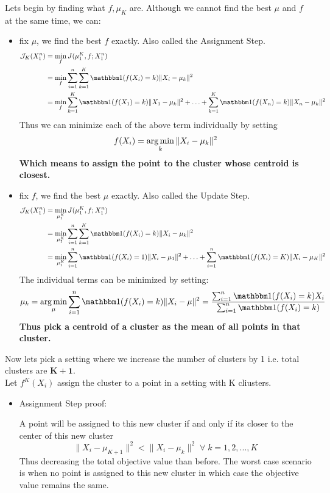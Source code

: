 \begin{enumerate}
\begin{soln}
Lets begin by finding what $f,\mu_K$ are. Although we cannot find the best $\mu$ and $f$ at the same time, we can:
\begin{itemize}
    \item fix $\mu$, we find the best $f$ exactly. Also called the Assignment Step.
    \begin{align*}
        \Jcal_K(X_1^n) &= \min_{f} J(\mu_1^K, f; X_1^n)\\
        &= \min_{f} \sum_{i=1}^n \sum_{k=1}^K \indfone(f(X_i) = k) \|X_i - \mu_k\|^2 \\
        &= \min_{f} \sum_{k=1}^K \indfone(f(X_1) = k) \|X_1 - \mu_k\|^2 + \ldots + \sum_{k=1}^K \indfone(f(X_n) = k) \|X_n - \mu_k\|^2
    \end{align*}
    Thus we can minimize each of the above term individually by setting
    $$
        f(X_i) = \operatorname*{arg\,min}_{k} \|X_i - \mu_k\|^2
    $$
    \textbf{Which means to assign the point to the cluster whose centroid is closest.}
    \item fix $f$, we find the best $\mu$ exactly. Also called the Update Step.
    \begin{align*}
        \Jcal_K(X_1^n) &= \min_{\mu_1^K} J(\mu_1^K, f; X_1^n)\\
        &= \min_{\mu_1^K} \sum_{i=1}^n \sum_{k=1}^K \indfone(f(X_i) = k) \|X_i - \mu_k\|^2 \\
        &= \min_{\mu_1^K} \sum_{i=1}^n \indfone(f(X_i) = 1) \|X_i - \mu_1\|^2 + \ldots + \sum_{i=1}^n \indfone(f(X_i) = K) \|X_i - \mu_K\|^2
    \end{align*}
    The individual terms can be minimized by setting:
    $$
        \mu_k = \argmin_{\mu} \sum_{i=1}^n\indfone(f(X_i) = k)\|X_i - \mu\|^2 = \frac{\sum_{i=1}^n\indfone(f(X_i) = k)X_i}{\sum_{i=1}^n\indfone(f(X_i) = k)}
    $$
    \textbf{Thus pick a centroid of a cluster as the mean of all points in that cluster.}
\end{itemize}

Now lets pick a setting where we increase the number of clusters by 1 i.e. total clusters are $\mathbf{K+1}$. \\
Let $f^{K}(X_i)$ assign the cluster to a point in a setting with K cliusters.
    
\begin{itemize}
    \item Assignment Step proof: 
    
    A point will be assigned to this new cluster if and only if its closer to the center of this new cluster
    $$
        \|X_i - \mu_{K+1}\|^2 < \|X_i - \mu_{k}\|^2 \;\forall\;k=1,2,...,K
    $$ 
    Thus decreasing the total objective value than before. The worst case scenario is when no point is assigned to this new cluster in which case the objective value remains the same.\\
    

\end{itemize}
\end{soln}
\end{enumerate}
